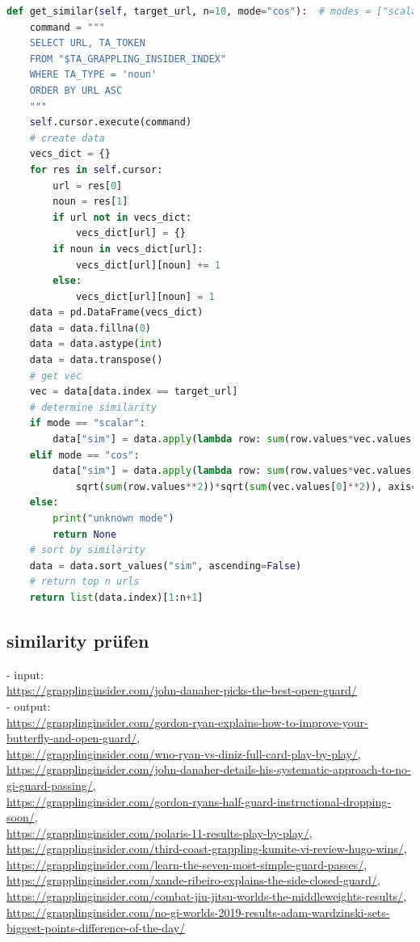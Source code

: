 {\color{MidnightBlue}
\begin{lstlisting}[language=python]
def get_similar(self, target_url, n=10, mode="cos"):  # modes = ["scalar", "cos"]
    command = """
    SELECT URL, TA_TOKEN
    FROM "$TA_GRAPPLING_INSIDER_INDEX"
    WHERE TA_TYPE = 'noun'
    ORDER BY URL ASC
    """
    self.cursor.execute(command)
    # create data
    vecs_dict = {}
    for res in self.cursor:
        url = res[0]
        noun = res[1]
        if url not in vecs_dict:
            vecs_dict[url] = {}
        if noun in vecs_dict[url]:
            vecs_dict[url][noun] += 1
        else:
            vecs_dict[url][noun] = 1
    data = pd.DataFrame(vecs_dict)
    data = data.fillna(0)
    data = data.astype(int)
    data = data.transpose()
    # get vec
    vec = data[data.index == target_url]
    # determine similarity
    if mode == "scalar":
        data["sim"] = data.apply(lambda row: sum(row.values*vec.values[0]), axis=1)
    elif mode == "cos":
        data["sim"] = data.apply(lambda row: sum(row.values*vec.values[0])/
            sqrt(sum(row.values**2))*sqrt(sum(vec.values[0]**2)), axis=1)
    else:
        print("unknown mode")
        return None
    # sort by similarity
    data = data.sort_values("sim", ascending=False)
    # return top n urls
    return list(data.index)[1:n+1]
\end{lstlisting}}

\subsection{similarity prüfen}

\noindent- input: \\
{\color{MidnightBlue}
\url{https://grapplinginsider.com/john-danaher-picks-the-best-open-guard/}} \\
\noindent- output: \\
{\color{MidnightBlue}
\url{https://grapplinginsider.com/gordon-ryan-explains-how-to-improve-your-butterfly-and-open-guard/}, \\
\url{https://grapplinginsider.com/wno-ryan-vs-diniz-full-card-play-by-play/}, \\
\url{https://grapplinginsider.com/john-danaher-details-his-systematic-approach-to-no-gi-guard-passing/}, \\
\url{https://grapplinginsider.com/gordon-ryans-half-guard-instructional-dropping-soon/}, \\
\url{https://grapplinginsider.com/polaris-11-results-play-by-play/}, \\
\url{https://grapplinginsider.com/third-coast-grappling-kumite-vi-review-hugo-wins/}, \\
\url{https://grapplinginsider.com/learn-the-seven-most-simple-guard-passes/}, \\
\url{https://grapplinginsider.com/xande-ribeiro-explains-the-side-closed-guard/}, \\
\url{https://grapplinginsider.com/combat-jiu-jitsu-worlds-the-middleweights-results/}, \\
\url{https://grapplinginsider.com/no-gi-worlds-2019-results-adam-wardzinski-sets-biggest-points-difference-of-the-day/}} \\

